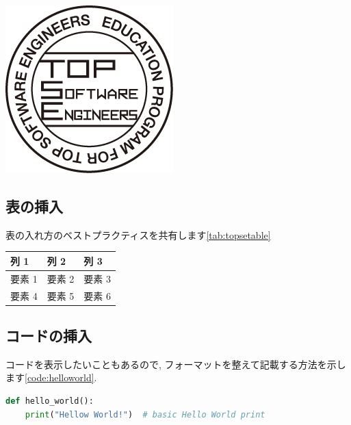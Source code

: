 \documentclass[a4paper,9pt]{extarticle}
\begin{document}
\begin{multicols}{2}
\begin{center}
\begin{minipage}{\linewidth}
\centering
\includegraphics[width=0.5\linewidth]{image.png}
\label{fig:topselogo}
\end{minipage}
\end{center}

\subsection{表の挿入}
表の入れ方のベストプラクティスを共有します\autoref{tab:topsetable}
\begin{center}
\begin{minipage}{\linewidth}
\centering
{}
\noindent\begin{tabularx}{\linewidth}{|X|X|X|}  
\hline
\textbf{列 1} & \textbf{列 2} & \textbf{列 3} \\
\hline
要素 1 & 要素 2 & 要素 3 \\
\hline
要素 4 & 要素 5 & 要素 6 \\
\hline
\end{tabularx}
\label{tab:topsetable}
\end{minipage}
\end{center}

\subsection{コードの挿入}
コードを表示したいこともあるので, フォーマットを整えて記載する方法を示します\autoref{code:helloworld}.

\begin{minipage}{0.95\linewidth}
\begin{lstlisting}[language=Python,caption={コードのキャプションはこちら.},label={code:helloworld}]
def hello_world():
    print("Hellow World!")  # basic Hello World print


\end{lstlisting}
\end{minipage}
\end{multicols}
\end{document}
